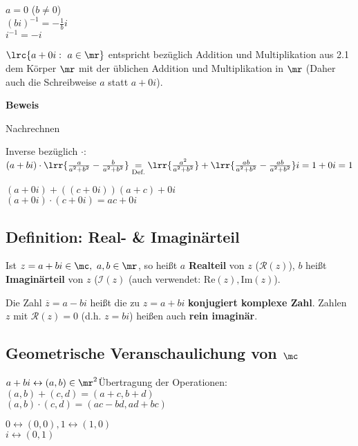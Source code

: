 		$a=0$ ($b\neq 0$)\\
		$(bi)^{-1}=-\frac{1}{b}i$\\
		$i^{-1}=-i$
		\item $\lrc{a+0i:\ a\in\mr}$ entspricht bezüglich Addition und Multiplikation aus 2.1 dem Körper $\mr$ mit der üblichen Addition und Multiplikation in $\mr$ (Daher auch die Schreibweise $a$ statt $a+0i$).
	\subExEnd

	\textbf{Beweis}
		\item Nachrechnen
		\item Inverse bezüglich $\cdot$:\\
		$(a+bi)\cdot\lrr{\frac{a}{a^2+b^2}-\frac{b}{a^2+b^2}}\underset{\mbox{\scriptsize Def.}}{=}\lrr{\frac{a^2}{a^2+b^2}}+\lrr{\frac{ab}{a^2+b^2}-\frac{ab}{a^2+b^2}}i=1+0i=1$
		\item $(a+0i)+((c+0i))(a+c)+0i$\\
		$(a+0i)\cdot(c+0i)=ac+0i$
	\subExEnd

\subsection{Definition: Real- \& Imaginärteil}
	Ist $z=a+bi\in\mc,\ a,b\in\mr$, so heißt $a$ \textbf{Realteil} von $z$ ($\mathcal{R}(z)$), $b$ heißt \textbf{Imaginärteil} von $z$ ($\mathcal{I}(z)$ (auch verwendet: $\mbox{Re}(z),\mbox{Im}(z)$).

	Die Zahl $\overline{z}=a-bi$ heißt die zu $z=a+bi$ \textbf{konjugiert komplexe Zahl}. Zahlen $z$ mit $\mathcal{R}(z)=0$ (d.h. $z=bi$) heißen auch \textbf{rein imaginär}.

\subsection{Geometrische Veranschaulichung von \texorpdfstring{$\mc$}{C}}
	$a+bi\leftrightarrow(a,b)\in\mr^2$\quad Übertragung der Operationen:\\
	$(a,b)+(c,d)=(a+c,b+d)$\\
	$(a,b)\cdot(c,d)=(ac-bd,ad+bc)$

	$0\leftrightarrow(0,0), 1\leftrightarrow(1,0)$\\
	$i\leftrightarrow(0,1)$

